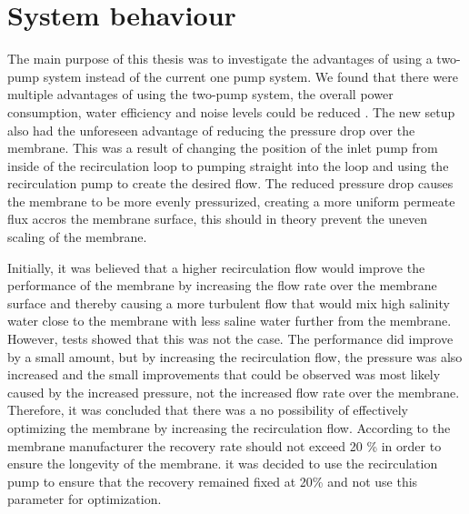 

\section{System behaviour} 




The main purpose of this thesis was to investigate the advantages of using a two-pump system instead of the current one pump system. We found that there were multiple advantages of using the two-pump system, the overall power consumption, water efficiency and noise levels could be reduced . The new setup also had the unforeseen advantage of reducing the pressure drop over the membrane. This was a result of changing the position of the inlet pump from inside of the recirculation loop to pumping straight into the loop and using the recirculation pump to create the desired flow. The reduced pressure drop causes the membrane to be more evenly pressurized, creating a more uniform permeate flux accros the membrane surface, this should in theory prevent the uneven scaling of the membrane.

Initially, it was believed that a higher recirculation flow would improve the performance of the membrane by increasing the flow rate over the membrane surface and thereby causing a more turbulent flow that would mix high salinity water close to the membrane with less saline water further from the membrane. However, tests showed that this was not the case. The performance did improve by a small amount, but by increasing the recirculation flow, the pressure was also increased and the small improvements that could be observed was most likely caused by the increased pressure, not the increased flow rate over the membrane. Therefore, it was concluded that there was a no possibility of effectively optimizing the membrane by increasing the recirculation flow. According to the membrane manufacturer the recovery rate should not exceed 20 \% in order to ensure the longevity of the membrane. it was decided to use the recirculation pump to ensure that the recovery remained fixed at 20\% and not use this parameter for optimization.

